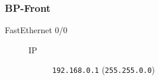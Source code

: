 \subsubsection{BP-Front}

	\begin{description}
		\item[FastEthernet 0/0] 
		\begin{description}
			\item[IP] \texttt{192.168.0.1} (\texttt{255.255.0.0})
		\end{description}

	\end{description}
